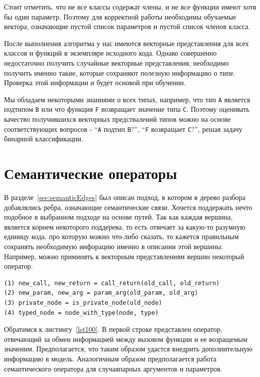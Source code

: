 \documentclass[times,specification,annotation]{itmo-student-thesis}
\begin{document}
Стоит отметить, что не все классы содержат члены, и не все функции имеют хотя бы один параметр. Поэтому для корректной работы необходимы обучаемые вектора, означающие пустой список параметров и пустой список членов класса.

После выполнения алгоритма у нас имеются векторные представления для всех классов и функций в экземпляре исходного кода. Однако совершенно недостаточно получить случайные векторные представления, необходимо получить именно такие, которые сохраняют полезную информацию о типе. Проверка этой информации и будет основой при обучении. 

Мы обладаем некоторыми знаниями о всех типах, например, что тип \texttt{A} является подтипом \texttt{B} или что функция \texttt{F} возвращает значение типа \texttt{C}. Поэтому оценивать качество получившихся векторных предствалений типов можно на основе соответствующих вопросов - ``\texttt{A} подтип \texttt{B}?'', ``\texttt{F} возвращает \texttt{C}?'', решая задачу бинарной классификации.

\section{Семантические операторы}\label{semOps}
В разделе~\ref{sec:semanticEdges} был описан подход, в котором в дерево разбора добавлялись ребра, означающие семантические связи. Хочется поддержать нечто подобное в выбранном подходе на основе путей. Так как каждая вершина, является корнем некоторого поддерева, то есть отвечает за какую-то разумную единицу кода, про которую можно что-либо сказать, то кажется правильным сохранять необходимую инфорацию именно в описании этой вершины. Например, можно приминять к векторным представлениям вершин некоторый оператор.

\begin{lstlisting}[float=!h,caption={Примеры семантических операторов},label={lst100}]
(1) new_call, new_return = call_return(old_call, old_return)
(2) new_param, new_arg = param_arg(old_param, old_arg)
(3) private_node = is_private_node(old_node)
(4) typed_node = node_with_type(node, type)
\end{lstlisting}

Обратимся к листингу~\ref{lst100}. В первой строке представлен оператор, отвечающий за обмен информацией между вызовом функции и ее возращемым значеним. Предполагается, что таким образом удастся внедрить дополнительную информацию в модель. Аналогичным образом предполагается работа семантического оператора для случаяпарных аргументов и параметров. 
\end{document}
